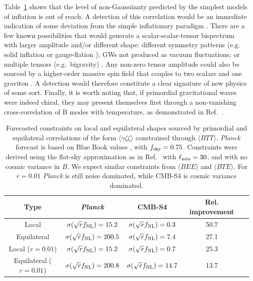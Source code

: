 Table~\ref{tab:fnl_forecast2} shows that the level of non-Gaussiianty predicted by the simplest models of inflation is out of reach. A detection of this correlation would be an immediate indication of some deviation from the simple inflationary paradigm \cite{Bordin:2016ruc,Dimastrogiovanni:2015pla}. There are a few known possibilities that would generate a scalar-scalar-tensor bispectrum with larger amplitude and/or different shape: different symmetry patterns (e.g. solid inflation \cite{Endlich:2012pz} or gauge-flation \cite{Maleknejad:2011jw, Adshead:2016iix}); GWs not produced as vacuum fluctuations; or multiple tensors (e.g.\ bigravity) \cite{Bordin:2016ruc}. Any non-zero tensor amplitude could also be sourced by a higher-order massive spin field that couples to two scalars and one graviton \cite{Dimastrogiovanni:2015pla}. A detection would therefore constitute a clear signature of new physics of some sort. Finally, it is worth noting that, if primordial gravitational waves were indeed chiral, they may present themselves first through a non-vanishing cross-correlation of B modes with temperature, as demonstrated in Ref.~\cite{Contaldi:2008yz}.

\begin{table}[t]
  \begin{center}
    \begin{tabular}{ | c || c | c | c | c |}
      \hline
      Type & {\it Planck} & CMB-S4 & Rel. improvement  \\ \hline \hline
      Local & $\sigma(\sqrt{r}f_{\rm NL}) = 15.2$ & $\sigma(\sqrt{r}f_{\rm NL}) = 0.3$ & 50.7\\ \hline 
      Equilateral &  $\sigma(\sqrt{r}f_{\rm NL}) = 200.5$ & $\sigma(\sqrt{r}f_{\rm NL}) = 7.4$ & 27.1\\ \hline 
      Local ($r = 0.01$) & $\sigma(\sqrt{r}f_{\rm NL}) = 15.2$ & $\sigma(\sqrt{r}f_{\rm NL}) = 0.7$ & 25.3\\ \hline 
      Equilateral ($r = 0.01$) &  $\sigma(\sqrt{r}f_{\rm NL}) = 200.8$ & $\sigma(\sqrt{r}f_{\rm NL}) = 14.7$ & 13.7\\ \hline 
    \end{tabular}
  \end{center}
  \caption{Forecasted constraints on local and equilateral shapes sourced by primordial and equilateral correlations of the form $\langle \gamma \zeta\zeta \rangle$ constrained through $\langle BTT \rangle$. {\it Planck\/} forecast is based on Blue Book values \cite{Planck:2006aa}, with $f_{\rm sky} = 0.75$. Constraints were derived using the flat-sky approximation as in Ref.~\cite{Meerburg:2016ecv} with $\ell_{\rm min} = 30$, and with no cosmic variance in $B$.  We expect similar constraints from $\langle BEE \rangle$ and $\langle BTE \rangle$. For $r = 0.01$ {\it Planck\/} is still noise dominated, while CMB-S4 is cosmic variance dominated. }
\label{tab:fnl_forecast2}
\end{table}



